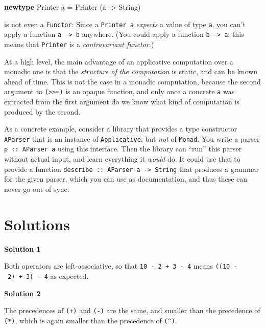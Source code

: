 \documentclass[11pt,
  american,
  DIV13]{article}
\newenvironment{Shaded}{}{}
\newcommand{\DataTypeTok}[1]{\textcolor[rgb]{0.56,0.13,0.00}{#1}}
\newcommand{\KeywordTok}[1]{\textcolor[rgb]{0.00,0.44,0.13}{\textbf{#1}}}
\newcommand{\NormalTok}[1]{#1}
\newcommand{\OtherTok}[1]{\textcolor[rgb]{0.00,0.44,0.13}{#1}}
\begin{document}
\begin{itemize}
\begin{Shaded}
\begin{Highlighting}[]
\KeywordTok{newtype} \DataTypeTok{Printer}\NormalTok{ a }\OtherTok{=} \DataTypeTok{Printer}\NormalTok{ (a }\OtherTok{{-}\textgreater{}} \DataTypeTok{String}\NormalTok{)}
\end{Highlighting}
\end{Shaded}

  is not even a \texttt{Functor}: Since a \texttt{Printer\ a}
  \emph{expects} a value of type \texttt{a}, you can't apply a function
  \texttt{a\ -\textgreater{}\ b} anywhere. (You could apply a function
  \texttt{b\ -\textgreater{}\ a}; this means that \texttt{Printer} is a
  \emph{contravariant functor}.)
\end{itemize}

At a high level, the main advantage of an applicative computation over a
monadic one is that the \emph{structure of the computation} is static,
and can be known ahead of time. This is not the case in a monadic
computation, because the second argument to
\texttt{(\textgreater{}\textgreater{}=)} is an opaque function, and only
once a concrete \texttt{a} was extracted from the first argument do we
know what kind of computation is produced by the second.

As a concrete example, consider a library that provides a type
constructor \texttt{AParser} that is an instance of
\texttt{Applicative}, but \emph{not} of \texttt{Monad}. You write a
parser \texttt{p\ ::\ AParser\ a} using this interface. Then the library
can ``run'' this parser without actual input, and learn everything it
\emph{would} do. It could use that to provide a function
\texttt{describe\ ::\ AParser\ a\ -\textgreater{}\ String} that produces
a grammar for the given parser, which you can use as documentation, and
thus these can never go out of sync.

\section*{Solutions}

\textbf{Solution 1}

Both operators are left-associative, so that
\texttt{10\ -\ 2\ +\ 3\ -\ 4} means \texttt{((10\ -\ 2)\ +\ 3)\ -\ 4} as
expected.

\textbf{Solution 2}

The precedences of \texttt{(+)} and \texttt{(-)} are the same, and
smaller than the precedence of \texttt{(*)}, which is again smaller than
the precedence of \texttt{(\^{})}.
\end{document}
